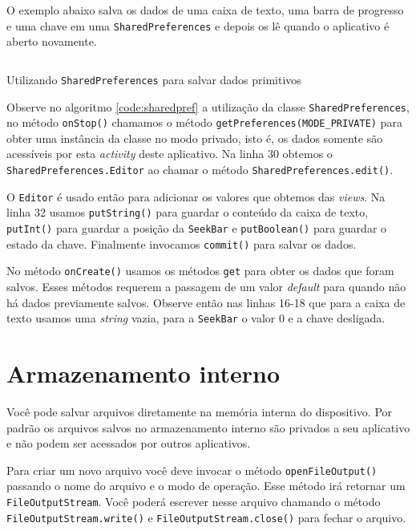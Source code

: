 \documentclass[a4paper,12pt,brazil]{book}
\begin{document}
\begin{singlespace}
		O exemplo abaixo salva os dados de uma caixa de texto, uma barra de progresso e uma chave em uma \texttt{SharedPreferences} e depois os lê quando o aplicativo é aberto novamente.

		\begin{listing}[H]
		\inputminted[linenos=true,fontsize=\small,frame=lines, framesep=2mm, tabsize=2,numbersep=5pt]{java}{src/api/storage/sharedpref.java}
		\caption{Utilizando \texttt{SharedPreferences} para salvar dados primitivos}
		\label{code:sharedpref}
		\end{listing} 	
		
		Observe no algoritmo \ref{code:sharedpref} a utilização da classe \texttt{SharedPreferences}, no método \texttt{onStop()} chamamos o método \texttt{getPreferences(MODE\_PRIVATE)} para obter uma instância da classe no modo privado, isto é, os dados somente são acessíveis por esta \emph{activity} deste aplicativo. Na linha 30 obtemos o \texttt{SharedPreferences.Editor} ao chamar o método \texttt{SharedPreferences.edit()}.
		
		O \texttt{Editor} é usado então para adicionar os valores que obtemos das \emph{views}. Na linha 32 usamos \texttt{putString()} para guardar o conteúdo da caixa de texto,
\texttt{putInt()} para guardar a posição da \texttt{SeekBar} e \texttt{putBoolean()} para guardar o estado da chave. Finalmente invocamos \texttt{commit()} para salvar os dados.

		No método \texttt{onCreate()} usamos os métodos \texttt{get} para obter os dados que foram salvos. Esses métodos requerem a passagem de um valor \emph{default} para quando não há dados previamente salvos. Observe então nas linhas 16-18 que para a caixa de texto usamos uma \emph{string} vazia, para a \texttt{SeekBar} o valor 0 e a chave desligada.


		\section{Armazenamento interno}

		Você pode salvar arquivos diretamente na memória interna do dispositivo. Por padrão os arquivos salvos no armazenamento interno são privados a seu aplicativo e não podem ser acessados por outros aplicativos. 

		Para criar um novo arquivo você deve invocar o método \texttt{openFileOutput()} passando o nome do arquivo e o modo de operação. Esse método irá retornar um \texttt{FileOutputStream}. Você poderá escrever nesse arquivo chamando o método \texttt{FileOutputStream.write()} e \texttt{FileOutputStream.close()} para fechar o arquivo.


\end{singlespace}
\end{document}
